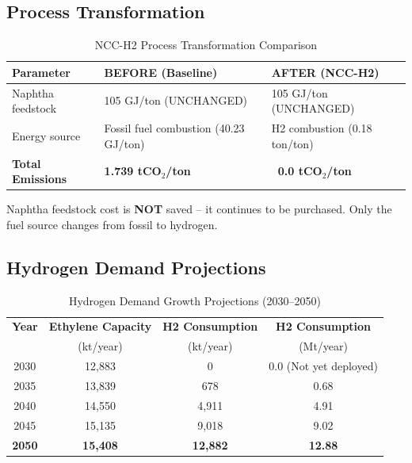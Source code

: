 \documentclass[11pt,a4paper]{report}
\newcommand{\tco}{tCO$_2$}
\begin{document}
\subsection{Process Transformation}

\begin{table}[H]
\centering
\caption{NCC-H2 Process Transformation Comparison}
\begin{tabular}{p{3cm}p{5cm}p{5cm}}
\toprule
\textbf{Parameter} & \textbf{BEFORE (Baseline)} & \textbf{AFTER (NCC-H2)} \\
\midrule
Naphtha feedstock & 105 GJ/ton (UNCHANGED) & 105 GJ/ton (UNCHANGED) \\
Energy source & Fossil fuel combustion (40.23 GJ/ton) & H2 combustion (0.18 ton/ton) \\
\textbf{Total Emissions} & \textbf{1.739 \tco/ton} & \textbf{~0.0 \tco/ton} \\
\bottomrule
\end{tabular}
\label{tab:ncch2-transformation}
\end{table}

\begin{tcolorbox}[colback=lightgray,colframe=darkblue,title=KEY INSIGHT]
Naphtha feedstock cost is \textbf{NOT} saved -- it continues to be purchased. Only the fuel source changes from fossil to hydrogen.
\end{tcolorbox}

\subsection{Hydrogen Demand Projections}

\begin{table}[H]
\centering
\caption{Hydrogen Demand Growth Projections (2030--2050)}
\begin{tabular}{cccc}
\toprule
\textbf{Year} & \textbf{Ethylene Capacity} & \textbf{H2 Consumption} & \textbf{H2 Consumption} \\
 & (kt/year) & (kt/year) & (Mt/year) \\
\midrule
2030 & 12,883 & 0 & 0.0 (Not yet deployed) \\
2035 & 13,839 & 678 & 0.68 \\
2040 & 14,550 & 4,911 & 4.91 \\
2045 & 15,135 & 9,018 & 9.02 \\
\rowcolor{lightgray}
\textbf{2050} & \textbf{15,408} & \textbf{12,882} & \textbf{12.88} \\
\bottomrule
\end{tabular}
\label{tab:h2-demand}
\end{table}
\end{document}
